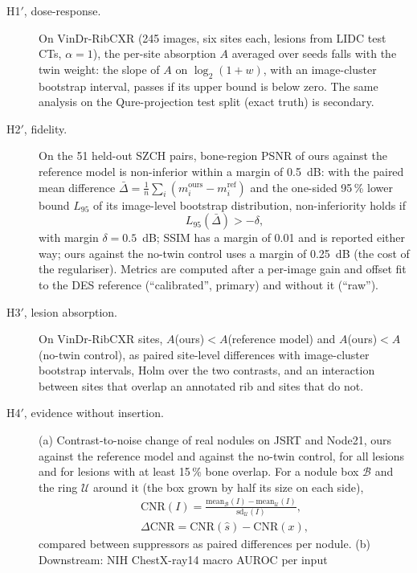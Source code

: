 \begin{description}
\item[H1$'$, dose-response.] On VinDr-RibCXR (245 images, six sites each, lesions from LIDC test CTs, $\alpha=1$), the per-site absorption $A$ averaged over
 seeds falls with the twin weight: the slope of $A$ on $\log_2(1+w)$, with an image-cluster bootstrap interval, passes if its upper bound is below zero.
 The same analysis on the Qure-projection test split (exact truth) is secondary.
\item[H2$'$, fidelity.] On the 51 held-out SZCH pairs, bone-region PSNR of ours against the reference model is non-inferior within a margin of 0.5~dB:
 with the paired mean difference $\bar\Delta=\frac1n\sum_i(m_i^{\mathrm{ours}}-m_i^{\mathrm{ref}})$ and the one-sided 95\,\% lower bound $L_{95}$
 of its image-level bootstrap distribution, non-inferiority holds if
 \begin{equation}
 L_{95}(\bar\Delta)>-\delta,
 \label{eq:ni}
 \end{equation}
 with margin $\delta=0.5$~dB; SSIM has a margin of 0.01 and is reported either way; ours against the
 no-twin control uses a margin of 0.25~dB (the cost of the regulariser). Metrics are computed after a per-image gain and offset fit to the DES reference
 (``calibrated'', primary) and without it (``raw'').
\item[H3$'$, lesion absorption.] On VinDr-RibCXR sites, $A$(ours)$<A$(reference model) and $A$(ours)$<A$(no-twin control), as paired site-level
 differences with image-cluster bootstrap intervals, Holm over the two contrasts, and an interaction between sites that overlap an annotated rib and sites
 that do not.
\item[H4$'$, evidence without insertion.] (a) Contrast-to-noise change of real nodules on JSRT and Node21, ours against the reference model and against
 the no-twin control, for all lesions and for lesions with at least 15\,\% bone overlap. For a nodule box $\mathcal{B}$ and the ring
 $\mathcal{U}$ around it (the box grown by half its size on each side),
 \begin{equation}
\begin{gathered}
\mathrm{CNR}(I)=\frac{\mathrm{mean}_{\mathcal{B}}(I)-\mathrm{mean}_{\mathcal{U}}(I)}{\mathrm{sd}_{\mathcal{U}}(I)},\\
\Delta\mathrm{CNR}=\mathrm{CNR}(\hat s)-\mathrm{CNR}(x),
\end{gathered}
\label{eq:cnr}
\end{equation}
 compared between suppressors as paired differences per nodule. (b) Downstream: NIH ChestX-ray14 macro AUROC per input

\end{description}
